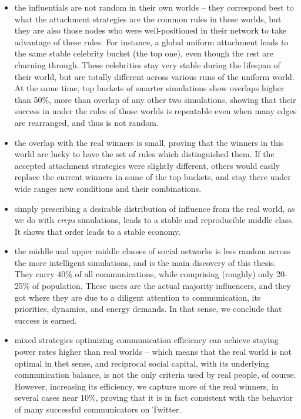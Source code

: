 \documentclass[10pt,oneside]{memoir}
\begin{document}
\begin{itemize}


\item the influentials are not random in their own worlds -- they correspond best to what the attachment strategies are the common rules in these worlds, but they are also those nodes who were well-positioned in their network to take advantage of these rules.  For instance, a global uniform attachment leads to the same stable celebrity bucket (the top one), even though the rest are churning through.  These celebrities stay very stable during the lifespan of their world, but are totally different across various runs of the uniform world.  At the same time, top buckets of smarter simulations show overlaps higher than 50\%, more than overlap of any other two simulations, showing that their success in under the rules of those worlds is repeatable even when many edges are rearranged, and thus is not random.




\item the overlap with the real winners is small, proving that the winners in this world are lucky to have the set of rules which distinguished them.  If the accepted attachment strategies were slightly different, others would easily replace the current winners in some of the top buckets, and stay there under wide ranges new conditions and their combinations.




\item simply prescribing a desirable distribution of influence from the real world, as we do with {\itshape creps} simulations, leads to a stable and reproducible middle class.  It shows that order leads to a stable economy.




\item the middle and upper middle classes of social networks is less random across the more intelligent simulations, and is the main discovery of this thesis.  They carry 40\% of all communications, while comprising (roughly) only 20-25\% of population.  These users are the actual majority influencers, and they got where they are due to a diligent attention to communication, its priorities, dynamics, and energy demands.  In that sense, we conclude that success is earned.




\item mixed strategies optimizing communication efficiency can achieve staying power rates higher than real worlds -- which means that the real world is not optimal in thet sense, and reciprocal social capital, with its underlying communication balance, is not the only criteria used by real people, of course.  However, increasing its efficiency, we capture more of the real winners, in several cases near 10\%, proving that it is in fact consistent with the behavior of many successful communicators on Twitter.



\end{itemize}
\end{document}
